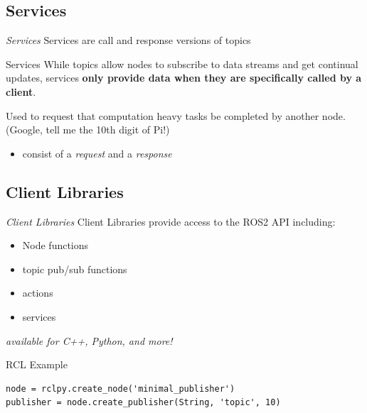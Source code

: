 \documentclass{beamer}
\begin{document}
\subsection{Services}
\begin{frame}{\textit{Services}}
    {\Huge Services are call and response versions of topics}
    \begin{block}{Services}
        While topics allow nodes to subscribe to data streams and get continual updates, services \textbf{only provide data when they are specifically called by a client}.
    \end{block}

    Used to request that computation heavy tasks be completed by another node. (Google, tell me the 10th digit of Pi!)

    \begin{itemize}
        \item consist of a \textit{request} and a \textit{response}
    \end{itemize}

    \href{https://docs.ros.org/en/iron/Tutorials/Beginner-CLI-Tools/Understanding-ROS2-Services/Understanding-ROS2-Services.html\#background}{}
\end{frame}

\subsection{Client Libraries}
\begin{frame}{\textit{Client Libraries}}
    {\Huge Client Libraries provide access to the ROS2 API including:}
    \begin{itemize}
        \item Node functions
        \item topic pub/sub functions
        \item actions
        \item services
    \end{itemize}

    \textit{available for C++, Python, and more!}

    \href{https://docs.ros.org/en/humble/Concepts/Basic/About-Client-Libraries.html?highlight=rclpy}{}
\end{frame}

\begin{frame}[fragile]{RCL Example}
    \begin{verbatim}
node = rclpy.create_node('minimal_publisher')
publisher = node.create_publisher(String, 'topic', 10)
    \end{verbatim}

    \href{https://github.com/ros2/examples/tree/rolling}{}
\end{frame}
\end{document}
